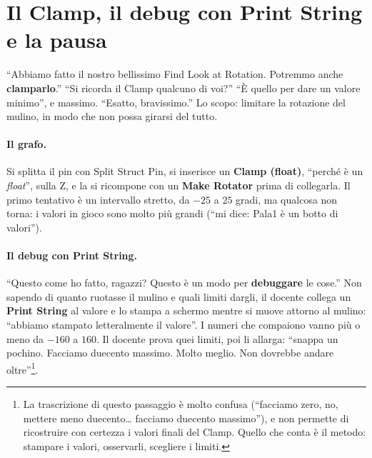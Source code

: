 \section{Il Clamp, il debug con Print String e la pausa}
\label{ue4:sec:clamp}

``Abbiamo fatto il nostro bellissimo Find Look at Rotation. Potremmo anche
\textbf{clamparlo}.'' ``Si ricorda il Clamp qualcuno di voi?'' ``È quello per dare un
valore minimo'', e massimo. ``Esatto, bravissimo.'' Lo scopo: limitare la rotazione del
mulino, in modo che non possa girarsi del tutto.

\paragraph{Il grafo.} Si splitta il pin con Split Struct Pin, si inserisce un
\textbf{Clamp (float)}, ``perché è un \emph{float}'', sulla Z, e la si ricompone con un
\textbf{Make Rotator} prima di collegarla. Il primo tentativo è un intervallo stretto,
da $-25$ a $25$ gradi, ma qualcosa non torna: i valori in gioco sono molto più grandi
(``mi dice: Pala1 è un botto di valori'').

\paragraph{Il debug con Print String.} ``Questo come ho fatto, ragazzi? Questo è un modo
per \textbf{debuggare} le cose.'' Non sapendo di quanto ruotasse il mulino e quali
limiti dargli, il docente collega un \textbf{Print String} al valore e lo stampa a
schermo mentre si muove attorno al mulino: ``abbiamo stampato letteralmente il
valore''. I numeri che compaiono vanno più o meno da $-160$ a $160$. Il docente prova
quei limiti, poi li allarga: ``snappa un pochino. Facciamo duecento massimo. Molto
meglio. Non dovrebbe andare oltre''\footnote{La trascrizione di questo passaggio è
molto confusa (``facciamo zero, no, mettere meno duecento\ldots{} facciamo duecento
massimo''), e non permette di ricostruire con certezza i valori finali del Clamp.
Quello che conta è il metodo: stampare i valori, osservarli, scegliere i limiti.}.

